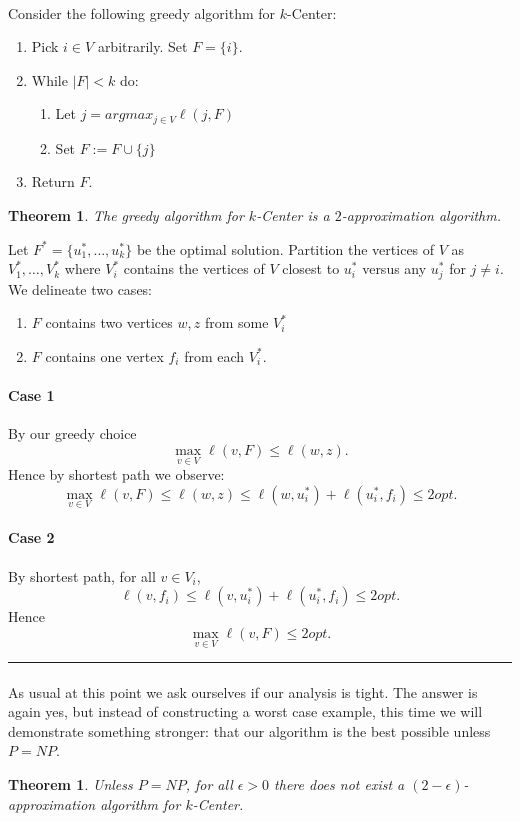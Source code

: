 \documentclass[letterpaper,12pt,oneside,onecolumn]{article}
\newenvironment{proof}{{\bf Proof:  }}{\hfill\rule{2mm}{2mm}}
\newtheorem{theorem}[fact]{Theorem}
\begin{document}
\paragraph{}
Consider the following greedy algorithm for $k$-Center:
\begin{enumerate}
\item Pick $i \in V$ arbitrarily. Set $F = \{i\}$.
\item While $|F| < k$ do:
	\begin{enumerate}
	\item Let $j = argmax_{j \in V} \ell(j,F)$
	\item Set $F:= F \cup \{j\}$
	\end{enumerate}
\item Return $F$.
\end{enumerate}
\begin{theorem}
The greedy algorithm for $k$-Center is a $2$-approximation algorithm.
\end{theorem}
\begin{proof}
Let $F^* = \{u_1^*, \dots, u_k^*\}$ be the optimal solution. Partition the vertices of $V$ as $V_1^*, \dots, V_k^*$ where $V_i^*$ contains the vertices of $V$ closest to $u_i^*$ versus any $u_j^*$ for $j \neq i$. We delineate two cases:
\begin{enumerate}
\item $F$ contains two vertices $w,z$ from some $V_i^*$
\item $F$ contains one vertex $f_i$ from each $V_i^*$.
\end{enumerate}
\paragraph{Case 1}
By our greedy choice $$\max_{v \in V} \ell(v,F) \leq \ell (w,z).$$
Hence by shortest path we observe:
 $$\max_{v \in V} \ell(v,F) \leq \ell (w,z) \leq \ell(w, u_i^*) + \ell(u_i^*, f_i) \leq 2opt.$$
\paragraph{Case 2}
By shortest path, for all $v \in V_i$,
$$\ell(v,f_i) \leq \ell(v,u_i^*) + \ell(u_i^*,f_i) \leq 2opt.$$
Hence
$$\max_{v \in V} \ell(v,F) \leq 2opt.$$
\end{proof}
\paragraph{}
As usual at this point we ask ourselves if our analysis is tight. The answer is again yes, but instead of constructing a worst case example, this time we will demonstrate something stronger: that our algorithm is the best possible unless $P = NP$.
\begin{theorem}
Unless $P=NP$, for all $\epsilon > 0$ there does not exist a $(2-\epsilon)$-approximation algorithm for $k$-Center. 
\end{theorem}
\end{document}
